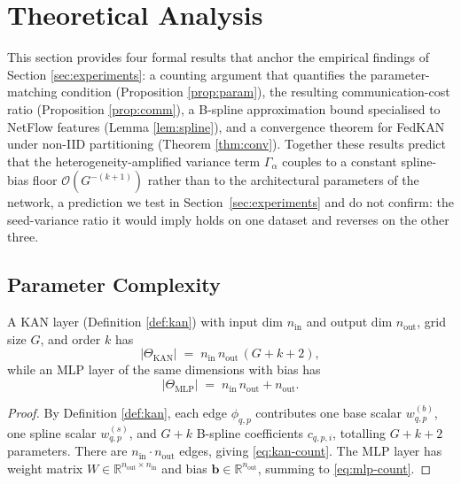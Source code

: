 \section{Theoretical Analysis}\label{sec:theory}

This section provides four formal results that anchor the empirical findings of Section \ref{sec:experiments}: a counting argument that quantifies the parameter-matching condition (Proposition \ref{prop:param}), the resulting communication-cost ratio (Proposition \ref{prop:comm}), a B-spline approximation bound specialised to NetFlow features (Lemma \ref{lem:spline}), and a convergence theorem for FedKAN under non-IID partitioning (Theorem \ref{thm:conv}). Together these results predict that the heterogeneity-amplified variance term $\Gamma_\alpha$ couples to a constant spline-bias floor $\mathcal{O}(G^{-(k+1)})$ rather than to the architectural parameters of the network, a prediction we test in Section~\ref{sec:experiments} and do not confirm: the seed-variance ratio it would imply holds on one dataset and reverses on the other three.

\subsection{Parameter Complexity}

\begin{proposition}\label{prop:param}
A KAN layer (Definition \ref{def:kan}) with input dim $n_{\text{in}}$ and output dim $n_{\text{out}}$, grid size $G$, and order $k$ has
\begin{equation}\label{eq:kan-count}
|\Theta_{\text{KAN}}| \;=\; n_{\text{in}}\, n_{\text{out}} \,(G + k + 2),
\end{equation}
while an MLP layer of the same dimensions with bias has
\begin{equation}\label{eq:mlp-count}
|\Theta_{\text{MLP}}| \;=\; n_{\text{in}}\, n_{\text{out}} + n_{\text{out}}.
\end{equation}
\end{proposition}

\begin{proof}
By Definition \ref{def:kan}, each edge $\phi_{q,p}$ contributes one base scalar $w^{(b)}_{q,p}$, one spline scalar $w^{(s)}_{q,p}$, and $G+k$ B-spline coefficients $c_{q,p,i}$, totalling $G+k+2$ parameters. There are $n_{\text{in}}\cdot n_{\text{out}}$ edges, giving \eqref{eq:kan-count}. The MLP layer has weight matrix $W \in \mathbb{R}^{n_{\text{out}} \times n_{\text{in}}}$ and bias $\mathbf{b} \in \mathbb{R}^{n_{\text{out}}}$, summing to \eqref{eq:mlp-count}.
\end{proof}

